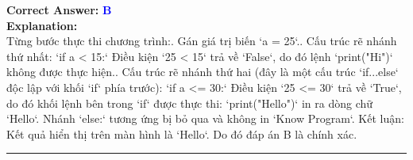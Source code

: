 \documentclass[11pt,a4paper]{article}
\begin{document}
\begin{minipage}{\textwidth}
\noindent \textbf{Correct Answer:} \textcolor{blue}{\textbf{B}} \\[4pt]
\noindent \textbf{Explanation:}\\
Từng bước thực thi chương trình:. Gán giá trị biến `a = 25`.. Cấu trúc rẽ nhánh thứ nhất:\newline
   `if a < 15:`\newline
   Điều kiện `25 < 15` trả về `False`, do đó lệnh `print("Hi")` không được thực hiện.. Cấu trúc rẽ nhánh thứ hai (đây là một cấu trúc `if...else` độc lập với khối `if` phía trước):\newline
   `if a <= 30:`\newline
   Điều kiện `25 <= 30` trả về `True`, do đó khối lệnh bên trong `if` được thực thi: `print("Hello")` in ra dòng chữ `Hello`.\newline
   Nhánh `else:` tương ứng bị bỏ qua và không in `Know Program`.\newline
Kết luận: Kết quả hiển thị trên màn hình là `Hello`. Do đó đáp án B là chính xác.
\end{minipage}
\vspace{0.8cm}
\hrule
\vspace{0.5cm}
\end{document}

